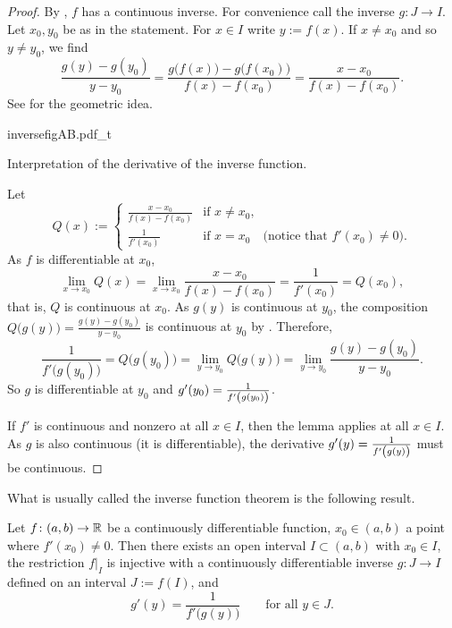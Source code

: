 \begin{proof}
By , $f$ has a continuous inverse.  For convenience
call the inverse $g \colon J \to I$.
Let $x_0,y_0$ be as in the statement.  For $x \in I$ write $y := f(x)$.
If $x \not= x_0$ and so $y \not= y_0$, we find
\begin{equation*}
\frac{g(y)-g(y_0)}{y-y_0} =
\frac{g\bigl(f(x)\bigr)-g\bigl(f(x_0)\bigr)}{f(x)-f(x_0)} =
\frac{x-x_0}{f(x)-f(x_0)} .
\end{equation*}
See  for the geometric idea.
\begin{myfigureht}
{inversefigAB.pdf_t}
\caption{Interpretation of the derivative of the inverse
function.\label{inversefig}}
\end{myfigureht}

Let
\begin{equation*}
Q(x) :=
\begin{cases}
\frac{x-x_0}{f(x)-f(x_0)} & \text{if } x \neq x_0, \\
\frac{1}{f'(x_0)}         & \text{if } x = x_0 \quad \text{(notice that }
f'(x_0) \neq 0 \text{)}.
\end{cases}
\end{equation*}
As $f$ is differentiable at $x_0$, 
\begin{equation*}
\lim_{x \to x_0} Q(x) =
\lim_{x \to x_0} 
\frac{x-x_0}{f(x)-f(x_0)} 
=
\frac{1}{f'(x_0)}
=
Q(x_0) ,
\end{equation*}
that is, $Q$ is continuous at $x_0$.
As $g(y)$ is continuous at $y_0$,
the composition $Q\bigl(g(y)\bigr) = \frac{g(y)-g(y_0)}{y-y_0}$
is continuous at $y_0$ by
.
Therefore,
\begin{equation*}
\frac{1}{f'\bigl(g(y_0)\bigr)}
= Q\bigl(g(y_0)\bigr)
= \lim_{y \to y_0} Q\bigl(g(y)\bigr)
= \lim_{y \to y_0} \frac{g(y)-g(y_0)}{y-y_0} .
\end{equation*}
So $g$ is differentiable at $y_0$ and $g'(y_0) =
\frac{1}{f'\left(\vphantom{1^1_1}g(y_0)\right)}$.

If $f'$ is continuous and nonzero at all $x \in I$,
then the lemma applies at all $x \in I$.  As $g$ is also
continuous (it is differentiable), the derivative $g'(y) =
\frac{1}{f'\left(\vphantom{1^1_1}g(y)\right)}$ must be continuous.
\end{proof}

What is usually called the inverse function theorem is the following result.

\begin{thm}
Let $f \colon (a,b) \to {\mathbb{R}}$ be a continuously differentiable function,
$x_0 \in (a,b)$ a point where $f'(x_0) \not= 0$.  Then there exists
an open interval $I \subset (a,b)$ with $x_0 \in I$, the
restriction $f|_{I}$ is injective with a continuously differentiable inverse
$g \colon J \to I$ defined on an interval $J := f(I)$,
and
\begin{equation*}
g'(y) = \frac{1}{f'\bigl( g(y) \bigr)} \qquad \text{for all } y \in J.
\end{equation*}
\end{thm}

